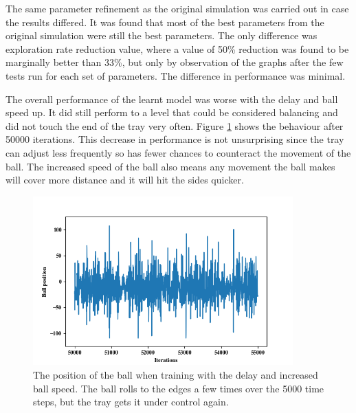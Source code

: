 \documentclass[12pt,a4paper]{article}
\begin{document}
The same parameter refinement as the original simulation was carried out in case the results differed. It was found that most of the best parameters from the original simulation were still the best parameters. The only difference was exploration rate reduction value, where a value of 50\% reduction was found to be marginally better than 33\%, but only by observation of the graphs after the few tests run for each set of parameters. The difference in performance was minimal.

The overall performance of the learnt model was worse with the delay and ball speed up. It did still perform to a level that could be considered balancing and did not touch the end of the tray very often. Figure \ref{refined_sim_general} shows the behaviour after 50000 iterations. This decrease in performance is not unsurprising since the tray can adjust less frequently so has fewer chances to counteract the movement of the ball. The increased speed of the ball also means any movement the ball makes will cover more distance and it will hit the sides quicker.

\begin{figure}[H]
	\centering
	\includegraphics[width=10cm]{195}
	\caption{The position of the ball when training with the delay and increased ball speed. The ball rolls to the edges a few times over the 5000 time steps, but the tray gets it under control again. }
	\label{refined_sim_general}
\end{figure}
\end{document}
